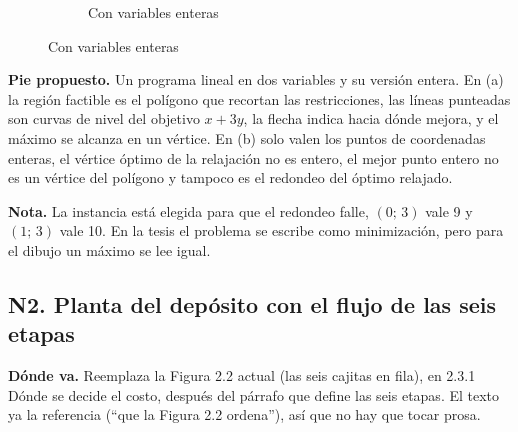 \documentclass[a4paper,10pt]{article}
\newcommand{\donde}[1]{\par\noindent\textbf{Dónde va.} #1\par\smallskip}
\newcommand{\pie}[1]{\par\noindent\textbf{Pie propuesto.} #1\par\smallskip}
\newcommand{\nota}[1]{\par\noindent\textbf{Nota.} #1\par\smallskip}
\begin{document}
\begin{figure}[H]
\begin{subfigure}{0.48\textwidth}
        \caption{Con variables enteras}
    \end{subfigure}
\end{figure}

\pie{Un programa lineal en dos variables y su versión entera. En (a) la región
factible es el polígono que recortan las restricciones, las líneas punteadas
son curvas de nivel del objetivo $x + 3y$, la flecha indica hacia dónde
mejora, y el máximo se alcanza en un vértice. En (b) solo valen los puntos de
coordenadas enteras, el vértice óptimo de la relajación no es entero, el
mejor punto entero no es un vértice del polígono y tampoco es el redondeo del
óptimo relajado.}

\nota{La instancia está elegida para que el redondeo falle, $(0;\,3)$ vale 9
y $(1;\,3)$ vale 10. En la tesis el problema se escribe como minimización,
pero para el dibujo un máximo se lee igual.}

\clearpage
\subsection{N2. Planta del depósito con el flujo de las seis etapas}

\donde{Reemplaza la Figura 2.2 actual (las seis cajitas en fila), en 2.3.1
Dónde se decide el costo, después del párrafo que define las seis etapas. El
texto ya la referencia (``que la Figura 2.2 ordena''), así que no hay que
tocar prosa.}
\end{document}
